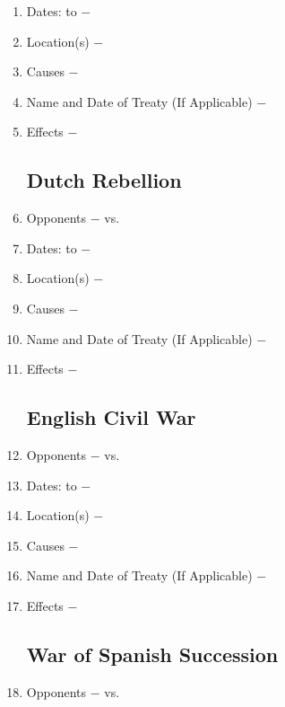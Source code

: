 \documentclass[12pt]{article}
\begin{document}
\begin{enumerate}
\item Dates: to $-$

\item Location(s) $-$ 

\item Causes $-$

\item Name and Date of Treaty (If Applicable) $-$ 

\item Effects $-$

\subsection{Dutch Rebellion}

\item Opponents $-$ vs.

\item Dates: to $-$

\item Location(s) $-$ 

\item Causes $-$

\item Name and Date of Treaty (If Applicable) $-$ 

\item Effects $-$ 

\subsection{English Civil War}

\item Opponents $-$ vs.

\item Dates: to $-$

\item Location(s) $-$ 

\item Causes $-$

\item Name and Date of Treaty (If Applicable) $-$ 

\item Effects $-$ 

\subsection{War of Spanish Succession}
 
\item Opponents $-$ vs.


\end{enumerate}
\end{document}
